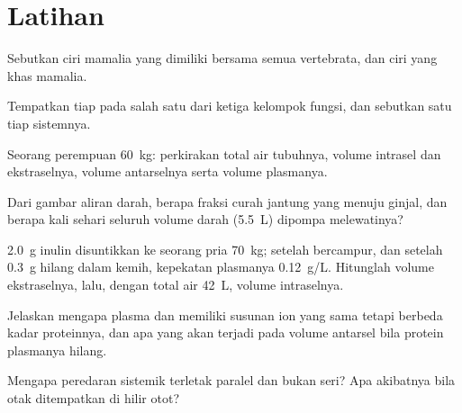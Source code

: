 \section{Latihan}

\begin{exercise}[$\star$]\label{exo:b1:mammal-organization:1}
Sebutkan ciri  mamalia yang dimiliki bersama semua vertebrata,
dan ciri yang khas mamalia.
\end{exercise}

\begin{exercise}[$\star$]\label{exo:b1:mammal-organization:2}
Tempatkan tiap  pada salah satu dari ketiga kelompok fungsi,
dan sebutkan satu  tiap sistemnya.
\end{exercise}

\begin{exercise}[$\star$]\label{exo:b1:mammal-organization:3}
Seorang perempuan \qty{60}{kg}: perkirakan total air tubuhnya, volume
intrasel dan ekstraselnya, volume antarselnya serta volume plasmanya.
\end{exercise}

\begin{exercise}[$\star$]\label{exo:b1:mammal-organization:4}
Dari gambar aliran darah, berapa fraksi curah jantung yang menuju
ginjal, dan berapa kali sehari seluruh volume darah (\qty{5.5}{L})
dipompa melewatinya?
\end{exercise}

\begin{exercise}[$\star\star$]\label{exo:b1:mammal-organization:5}
\qty{2.0}{g} inulin disuntikkan ke seorang pria \qty{70}{kg}; setelah
bercampur, dan setelah \qty{0.3}{g} hilang dalam kemih, kepekatan
plasmanya \qty{0.12}{g/L}. Hitunglah volume ekstraselnya, lalu, dengan
total air \qty{42}{L}, volume intraselnya.
\end{exercise}

\begin{exercise}[$\star\star$]\label{exo:b1:mammal-organization:6}
Jelaskan mengapa plasma dan  memiliki susunan ion yang
sama tetapi berbeda kadar proteinnya, dan apa yang akan terjadi pada
volume antarsel bila protein plasmanya hilang.
\end{exercise}

\begin{exercise}[$\star\star$]\label{exo:b1:mammal-organization:7}
Mengapa  peredaran sistemik terletak paralel dan bukan seri? Apa
akibatnya bila otak ditempatkan di hilir otot?
\end{exercise}

